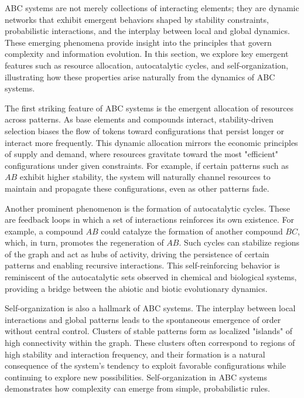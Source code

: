 \documentclass[%
 preprint, linenumbers,
 amsmath,amssymb,
 aps, physrev,
]{revtex4-2}
\begin{document}
ABC systems are not merely collections of interacting elements; they are dynamic networks that exhibit emergent behaviors shaped by stability constraints, probabilistic interactions, and the interplay between local and global dynamics. These emerging phenomena provide insight into the principles that govern complexity and information evolution. In this section, we explore key emergent features such as resource allocation, autocatalytic cycles, and self-organization, illustrating how these properties arise naturally from the dynamics of ABC systems.

The first striking feature of ABC systems is the emergent allocation of resources across patterns. As base elements and compounds interact, stability-driven selection biases the flow of tokens toward configurations that persist longer or interact more frequently. This dynamic allocation mirrors the economic principles of supply and demand, where resources gravitate toward the most "efficient" configurations under given constraints. For example, if certain patterns such as $AB$ exhibit higher stability, the system will naturally channel resources to maintain and propagate these configurations, even as other patterns fade.

Another prominent phenomenon is the formation of autocatalytic cycles. These are feedback loops in which a set of interactions reinforces its own existence. For example, a compound $AB$ could catalyze the formation of another compound $BC$, which, in turn, promotes the regeneration of $AB$. Such cycles can stabilize regions of the graph and act as hubs of activity, driving the persistence of certain patterns and enabling recursive interactions. This self-reinforcing behavior is reminiscent of the autocatalytic sets observed in chemical and biological systems, providing a bridge between the abiotic and biotic evolutionary dynamics.

Self-organization is also a hallmark of ABC systems. The interplay between local interactions and global patterns leads to the spontaneous emergence of order without central control. Clusters of stable patterns form as localized "islands" of high connectivity within the graph. These clusters often correspond to regions of high stability and interaction frequency, and their formation is a natural consequence of the system’s tendency to exploit favorable configurations while continuing to explore new possibilities. Self-organization in ABC systems demonstrates how complexity can emerge from simple, probabilistic rules.
\end{document}

